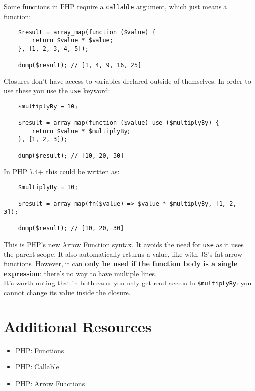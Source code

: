 \pagebreak


Some functions in PHP require a \texttt{callable} argument, which just means a function:

\begin{verbatim}
    $result = array_map(function ($value) {
        return $value * $value;
    }, [1, 2, 3, 4, 5]);

    dump($result); // [1, 4, 9, 16, 25]
\end{verbatim}

Closures don't have access to variables declared outside of themselves. In order to use these you use the \texttt{use} keyword:

\begin{verbatim}
    $multiplyBy = 10;

    $result = array_map(function ($value) use ($multiplyBy) {
        return $value * $multiplyBy;
    }, [1, 2, 3]);

    dump($result); // [10, 20, 30]
\end{verbatim}

In PHP 7.4+ this could be written as:

\begin{verbatim}
    $multiplyBy = 10;

    $result = array_map(fn($value) => $value * $multiplyBy, [1, 2, 3]);

    dump($result); // [10, 20, 30]
\end{verbatim}

This is PHP's new Arrow Function syntax. It avoids the need for \texttt{use} as it uses the parent scope. It also automatically returns a value, like with JS's fat arrow functions. However, it can \textbf{only be used if the function body is a single expression}: there's no way to have multiple lines.
\\

It's worth noting that in both cases you only get read access to \texttt{\$multiplyBy}: you cannot change its value inside the closure.


\pagebreak


\section{Additional Resources}

\begin{itemize}[leftmargin=*]
    \item \href{http://www.php.net/manual/en/functions.user-defined.php}{PHP: Functions}
    \item \href{http://www.php.net/manual/en/language.types.callable.php}{PHP: Callable}
    \item \href{https://www.php.net/manual/en/functions.arrow.php}{PHP: Arrow Functions}
\end{itemize}
